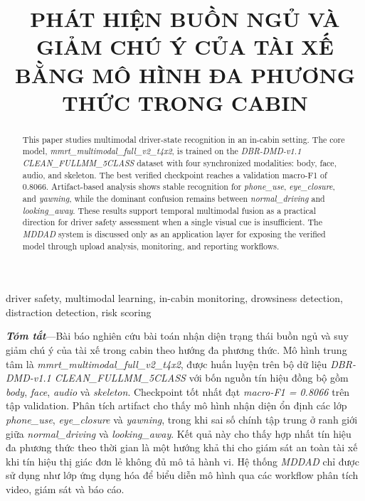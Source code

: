 \documentclass[conference,a4paper]{IEEEtran}
\title{\fontsize{20}{22}\selectfont PHÁT HIỆN BUỒN NGỦ VÀ GIẢM CHÚ Ý CỦA TÀI XẾ BẰNG MÔ HÌNH ĐA PHƯƠNG THỨC TRONG CABIN}
\author{
\IEEEauthorblockN{Ngo Van Minh, Nguyen Thi Phuong}
\IEEEauthorblockA{Group 01\\
Dai Nam University\\
Hanoi, Vietnam}
}
\begin{document}
\maketitle

\begin{abstract}
This paper studies multimodal driver-state recognition in an in-cabin setting. The core model, \textit{mmrt\_multimodal\_full\_v2\_t4x2}, is trained on the \textit{DBR-DMD-v1.1 CLEAN\_FULLMM\_5CLASS} dataset with four synchronized modalities: body, face, audio, and skeleton. The best verified checkpoint reaches a validation macro-F1 of 0.8066. Artifact-based analysis shows stable recognition for \textit{phone\_use}, \textit{eye\_closure}, and \textit{yawning}, while the dominant confusion remains between \textit{normal\_driving} and \textit{looking\_away}. These results support temporal multimodal fusion as a practical direction for driver safety assessment when a single visual cue is insufficient. The \textit{MDDAD} system is discussed only as an application layer for exposing the verified model through upload analysis, monitoring, and reporting workflows.
\end{abstract}

\begin{IEEEkeywords}
driver safety, multimodal learning, in-cabin monitoring, drowsiness detection, distraction detection, risk scoring
\end{IEEEkeywords}


\noindent\textbf{\textit{Tóm tắt}}---Bài báo nghiên cứu bài toán nhận diện trạng thái buồn ngủ và suy giảm chú ý của tài xế trong cabin theo hướng đa phương thức. Mô hình trung tâm là \textit{mmrt\_multimodal\_full\_v2\_t4x2}, được huấn luyện trên bộ dữ liệu \textit{DBR-DMD-v1.1 CLEAN\_FULLMM\_5CLASS} với bốn nguồn tín hiệu đồng bộ gồm \textit{body}, \textit{face}, \textit{audio} và \textit{skeleton}. Checkpoint tốt nhất đạt \textit{macro-F1 = 0.8066} trên tập validation. Phân tích artifact cho thấy mô hình nhận diện ổn định các lớp \textit{phone\_use}, \textit{eye\_closure} và \textit{yawning}, trong khi sai số chính tập trung ở ranh giới giữa \textit{normal\_driving} và \textit{looking\_away}. Kết quả này cho thấy hợp nhất tín hiệu đa phương thức theo thời gian là một hướng khả thi cho giám sát an toàn tài xế khi tín hiệu thị giác đơn lẻ không đủ mô tả hành vi. Hệ thống \textit{MDDAD} chỉ được sử dụng như lớp ứng dụng hóa để biểu diễn mô hình qua các workflow phân tích video, giám sát và báo cáo.
\end{document}
